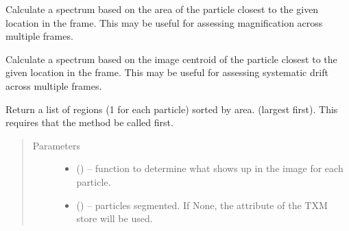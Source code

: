 \documentclass[letterpaper,10pt,english]{sphinxmanual}
\begin{document}
\begin{fulllineitems}
\begin{fulllineitems}
\end{fulllineitems}


\begin{fulllineitems}
\label{\detokenize{xanespy:xanespy.xanes_frameset.XanesFrameset.particle_area_spectrum}}
Calculate a spectrum based on the area of the particle closest to
the given location in the frame. This may be useful for assessing
magnification across multiple frames.

\end{fulllineitems}


\begin{fulllineitems}
\label{\detokenize{xanespy:xanespy.xanes_frameset.XanesFrameset.particle_centroid_spectrum}}
Calculate a spectrum based on the image centroid of the particle
closest to the given location in the frame. This may be useful
for assessing systematic drift across multiple frames.

\end{fulllineitems}


\begin{fulllineitems}
\label{\detokenize{xanespy:xanespy.xanes_frameset.XanesFrameset.particle_regions}}
Return a list of regions (1 for each particle) sorted by area.
(largest first). This requires that the 
method be called first.
\begin{quote}\begin{description}
\item[{Parameters}] \leavevmode\begin{itemize}
\item {} 
 (\sphinxstyleliteralemphasis{-}) --  function to determine what shows up in the
image for each particle.

\item {} 
 (\sphinxstyleliteralemphasis{-}) -- particles segmented. If None, the 
attribute of the TXM store will be used.


\end{itemize}
\end{description}
\end{quote}
\end{fulllineitems}
\end{fulllineitems}
\end{document}
